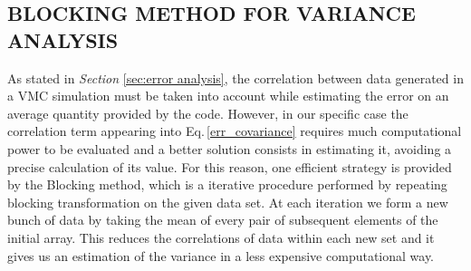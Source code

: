 \subsection{BLOCKING METHOD FOR VARIANCE ANALYSIS} \label{sec:blocking_method}
As stated in \textit{Section} \ref{sec:error analysis}, the correlation between data generated in a VMC simulation must be taken into account while estimating the error on an average quantity provided by the code. However, in our specific case the correlation term appearing into Eq.\,\ref{err_covariance} requires much computational power to be evaluated and a better solution consists in estimating it, avoiding a precise calculation of its value. For this reason, one efficient strategy is provided by the Blocking method, which is a iterative procedure performed by repeating blocking transformation on the given data set. At each iteration we form a new bunch of data by taking the mean of every pair of subsequent elements of the initial array. This reduces the correlations of data within each new set and it gives us an estimation of the variance in a less expensive computational way. 

